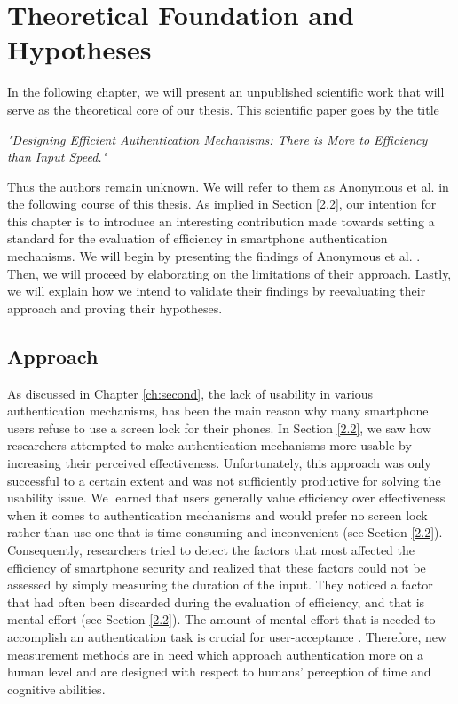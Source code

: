 
\chapter{Theoretical Foundation and Hypotheses}\label{ch:third}

In the following chapter, we will present an unpublished scientific work that will serve as the theoretical core of our thesis. This scientific paper goes by the title 
\begin{center}
 \textit{"Designing Efficient Authentication Mechanisms: There is More to Efficiency than Input Speed."}   
\end{center}
Thus the authors remain unknown. We will refer to them as Anonymous et al. \cite{anonymous} in the following course of this thesis. As implied in Section \ref{2.2}, our intention for this chapter is to introduce an interesting contribution made towards setting a standard for the evaluation of efficiency in smartphone authentication mechanisms. We will begin by presenting the findings of Anonymous et al. \cite{anonymous}. Then, we will proceed by elaborating on the limitations of their approach. Lastly, we will explain how we intend to validate their findings by reevaluating their approach and proving their hypotheses.

\section{Approach}

As discussed in Chapter \ref{ch:second}, the lack of usability in various authentication mechanisms, has been the main reason why many smartphone users refuse to use a screen lock for their phones. In Section \ref{2.2}, we saw how researchers attempted to make authentication mechanisms more usable by increasing their perceived effectiveness. Unfortunately, this approach was only successful to a certain extent and was not sufficiently productive for solving the usability issue. We learned that users generally value efficiency over effectiveness when it comes to authentication mechanisms and would prefer no screen lock rather than use one that is time-consuming and inconvenient (see Section \ref{2.2}). Consequently, researchers tried to detect the factors that most affected the efficiency of smartphone security and realized that these factors could not be assessed by simply measuring the duration of the input. They noticed a factor that had often been discarded during the evaluation of efficiency, and that is mental effort (see Section \ref{2.2}). The amount of mental effort that is needed to accomplish an authentication task is crucial for user-acceptance \cite{anonymous}. Therefore, new measurement methods are in need which approach authentication more on a human level and are designed with respect to humans' perception of time and cognitive abilities. \\

